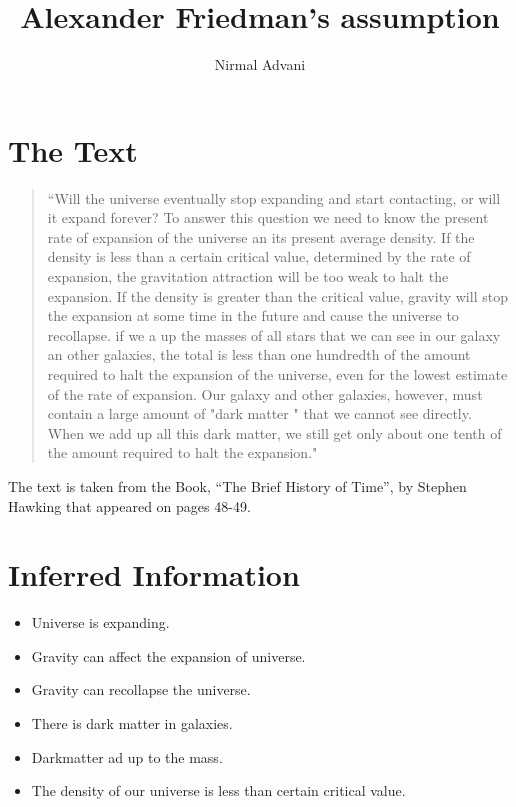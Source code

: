 \documentclass{article}
\title{Alexander Friedman's assumption}  %
\author{Nirmal Advani} %
\begin{document}
\maketitle

\section{The Text}

\begin{quotation}
  ``Will the universe eventually stop expanding and start contacting, or will it expand forever? To answer this question we need to know the present rate of expansion of the universe an its present average density. If the density is less than a certain critical value, determined by the rate of expansion, the gravitation attraction will be too weak to halt the expansion. If the density is greater than the critical value, gravity will stop the expansion at some time in the future and cause the universe to recollapse.
  if we a up the masses of all stars that we can see in our galaxy an other galaxies, the total is less than one hundredth of the amount required to halt the expansion of the universe, even for the lowest estimate of the rate of expansion. Our galaxy and other galaxies, however, must contain a large amount of "dark matter
  " that we cannot see directly. When we add up all this dark matter, we still get only about one tenth of the amount required to halt the expansion."
  
\end{quotation}

The text is taken from the Book, ``The Brief History of Time'', by Stephen Hawking that appeared on pages 48-49.
\section{Inferred Information}

\begin{itemize}
\item Universe is expanding.
\item Gravity can affect the expansion of universe.
\item Gravity can recollapse the universe.
\item There is dark matter in galaxies.
\item Darkmatter ad up to the mass.
\item The density of our universe is less than certain critical value.
\end{itemize}
\end{document}
